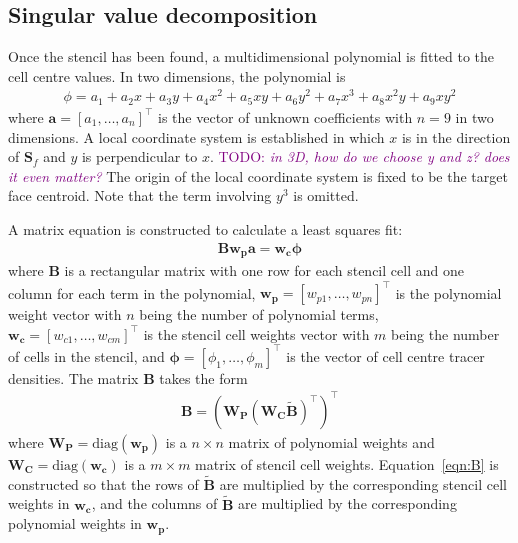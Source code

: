 \documentclass{article}
\newcommand{\TODO}[1]{\textcolor{purple}{TODO: \emph{#1}}}
\begin{document}
\subsection{Singular value decomposition}
Once the stencil has been found, a multidimensional polynomial is fitted to the cell centre values.
In two dimensions, the polynomial is
\begin{align}
	\phi = a_1 + a_2 x + a_3 y + a_4 x^2 + a_5 xy + a_6 y^2 + a_7 x^3 + a_8 x^2 y + a_9 x y^2
\end{align}
where $\mathbf{a} = [a_1, \ldots, a_n]^\intercal$ is the vector of unknown coefficients with $n=9$ in two dimensions.  A local coordinate system is established in which $x$ is in the direction of $\mathbf{S}_f$ and $y$ is perpendicular to $x$.
\TODO{in 3D, how do we choose y and z? does it even matter?}
The origin of the local coordinate system is fixed to be the target face centroid.
Note that the term involving $y^3$ is omitted.

A matrix equation is constructed to calculate a least squares fit:
\begin{align}
	\mathbf{B} \mathbf{w_p} \mathbf{a} = \mathbf{w_c} \bm{\phi}
\end{align}
where $\mathbf{B}$ is a rectangular matrix with one row for each stencil cell and one column for each term in the polynomial, $\mathbf{w_p} = [w_{p1}, \ldots, w_{pn}]^\intercal$ is the polynomial weight vector with $n$ being the number of polynomial terms,  $\mathbf{w_c} = [w_{c1}, \ldots, w_{cm}]^\intercal$ is the stencil cell weights vector with $m$ being the number of cells in the stencil, and $\bm{\phi} = [\phi_1, \ldots, \phi_m]^\intercal$ is the vector of cell centre tracer densities.
The matrix $\mathbf{B}$ takes the form
\begin{align}
	\mathbf{B} = \left( \mathbf{W_P} \left( \mathbf{W_C} \mathbf{\tilde{B}} \right)^\intercal \right)^\intercal \label{eqn:B}
\end{align}
where $\mathbf{W_P} = \mathrm{diag}(\mathbf{w_p})$ is a $n \times n$ matrix of polynomial weights and $\mathbf{W_C} = \mathrm{diag}(\mathbf{w_c})$ is a $m \times m$ matrix of stencil cell weights.  Equation~\ref{eqn:B} is constructed so that the rows of $\mathbf{\tilde{B}}$ are multiplied by the corresponding stencil cell weights in $\mathbf{w_c}$, and the columns of $\mathbf{\tilde{B}}$ are multiplied by the corresponding polynomial weights in $\mathbf{w_p}$.
\end{document}
